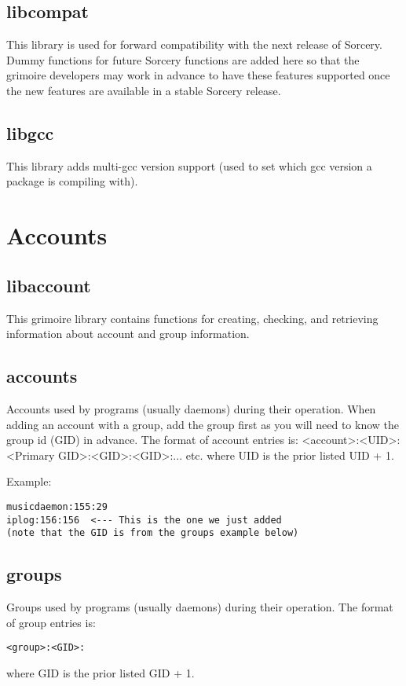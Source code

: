 \documentclass[a4paper,10pt]{book}
\begin{document}
\section{libcompat}
This library is used for forward compatibility with the next release of
Sorcery. Dummy functions for future Sorcery functions are added here so
that the grimoire developers may work in advance to have these features
supported once the new features are available in a stable Sorcery release.

\section{libgcc}
This library adds multi-gcc version support (used to set which gcc version
a package is compiling with).

\chapter{Accounts}
\section{libaccount}
This grimoire library contains functions for creating, checking, and
retrieving information about account and group information.

\section{accounts}
Accounts used by programs (usually daemons) during their operation. When
adding an account with a group, add the group first as you will need to
know the group id (GID) in advance. The format of account entries is:
	<account>:<UID>:<Primary GID>:<GID>:<GID>:... etc.
where UID is the prior listed UID + 1.

Example:
\begin{verbatim}
musicdaemon:155:29
iplog:156:156  <--- This is the one we just added
(note that the GID is from the groups example below)
\end{verbatim}

\section{groups}
Groups used by programs (usually daemons) during their operation. The format
of group entries is:
\begin{verbatim}
<group>:<GID>:
\end{verbatim}
where GID is the prior listed GID + 1.
\end{document}
